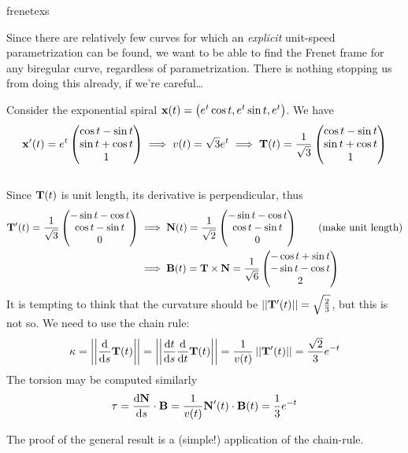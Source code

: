 \begin{examples}{}{frenetexs}
\end{examples}


	

                    

Since there are relatively few curves for which an \emph{explicit} unit-speed parametrization can be found, we want to be able to find the Frenet frame for any biregular curve, regardless of parametrization. There is nothing stopping us from doing this already, if we're careful\ldots

\begin{example}{}{}
Consider the exponential spiral $\vx(t)=\bigl(e^t\cos t,e^t\sin t,e^t\bigr)$. We have
\[
	\vx'(t)=e^t\threevec{\cos t-\sin t}{\sin t+\cos t}1 \implies v(t)=\sqrt 3e^t \implies \vT(t)=\frac{1}{\sqrt 3}\threevec{\cos t-\sin t}{\sin t+\cos t}1
\]\\ %
Since $\vT(t)$ is unit length, its derivative is perpendicular, thus
\begin{align*}
	\vT'(t)=\frac 1{\sqrt 3}\threevec{-\sin t-\cos t}{\cos t-\sin t}0 
	&\implies \vN(t)=\frac 1{\sqrt 2}\threevec{-\sin t-\cos t}{\cos t-\sin t}0 \tag{make unit length}\\
	&\implies\vB(t)=\vT\times\vN=\frac{1}{\sqrt 6}\threevec{-\cos t+\sin t}{-\sin t-\cos t}{2}
\end{align*}
It is tempting to think that the curvature should be $\Nm{\vT'(t)}=\sqrt{\frac 23}$, but this is not so. We need to use the chain rule:
\[\kappa=\Nm{\diff s\vT(t)}=\Nm{\diff[t]{s}\diff t\vT(t)}=\frac 1{v(t)}\Nm{\vT'(t)}=\frac{\sqrt 2}3e^{-t}\]
The torsion may be computed similarly
\[\tau=\diff[\vN]{s}\cdot\vB =\frac 1{v(t)}\vN'(t)\cdot\vB(t)=\frac 13e^{-t}\]
\end{example}

The proof of the general result is a (simple!) application of the chain-rule.

